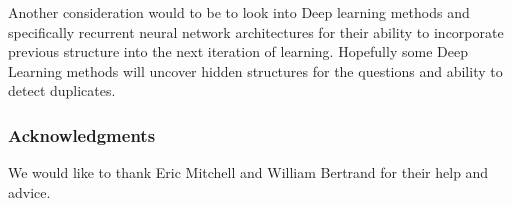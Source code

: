 \documentclass{article} %
\newcommand{\fix}{\marginpar{FIX}}
\begin{document}
\fix
Another consideration would to be to look into Deep learning methods and specifically recurrent neural network architectures for their ability to incorporate previous structure into the next iteration of learning. Hopefully some Deep Learning methods will uncover hidden structures for the questions and ability to detect duplicates.

\subsubsection*{Acknowledgments}

We would like to thank Eric Mitchell and William Bertrand for their help and advice.

\printbibliography
\end{document}
